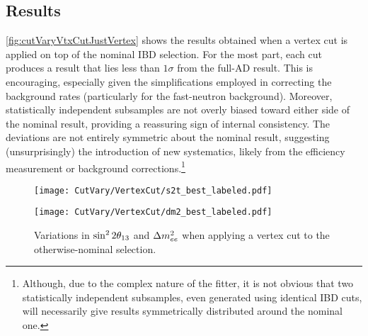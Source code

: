 \documentclass[../thesis.tex]{subfiles}
\begin{document}
\subsection{Results}
\label{sec:cutVaryVtxCutResults}


\autoref{fig:cutVaryVtxCutJustVertex} shows the results obtained when a vertex cut is applied on top of the nominal IBD selection. For the most part, each cut produces a result that lies less than $1\sigma$ from the full-AD result. This is encouraging, especially given the simplifications employed in correcting the background rates (particularly for the fast-neutron background). Moreover, statistically independent subsamples are not overly biased toward either side of the nominal result, providing a reassuring sign of internal consistency. The deviations are not entirely symmetric about the nominal result, suggesting (unsurprisingly) the introduction of new systematics, likely from the efficiency measurement or background corrections.\footnote{Although, due to the complex nature of the fitter, it is not obvious that two statistically independent subsamples, even generated using identical IBD cuts, will necessarily give results symmetrically distributed around the nominal one.}

\begin{figure}[ht]
  \begin{minipage}{0.47\linewidth}%
    \texttt{[image: CutVary/VertexCut/s2t\_best\_labeled.pdf]}%
  \end{minipage}%
  \begin{minipage}{0.47\linewidth}%
    \texttt{[image: CutVary/VertexCut/dm2\_best\_labeled.pdf]}%
  \end{minipage}%
  \caption{Variations in $\sin^2 2\theta_{13}$ and $\Delta m^2_{ee}$ when applying a vertex cut to the otherwise-nominal selection.}
  \label{fig:cutVaryVtxCutJustVertex}
\end{figure}
\end{document}
